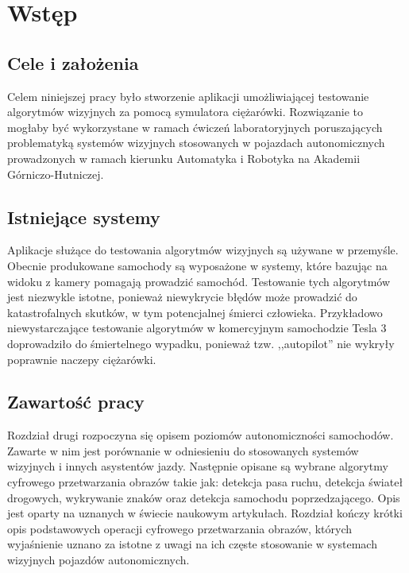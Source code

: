 \chapter{Wstęp}



\section{Cele i założenia}

Celem niniejszej pracy było stworzenie aplikacji umożliwiającej testowanie algorytmów wizyjnych za pomocą symulatora ciężarówki.
Rozwiązanie to mogłaby być wykorzystane w ramach ćwiczeń laboratoryjnych poruszających problematyką systemów wizyjnych stosowanych w pojazdach autonomicznych prowadzonych w ramach kierunku Automatyka i Robotyka na Akademii Górniczo-Hutniczej.

\section{Istniejące systemy}
Aplikacje służące do testowania algorytmów wizyjnych są używane w przemyśle. 
Obecnie produkowane samochody są wyposażone w systemy, które bazując na widoku z kamery pomagają prowadzić samochód. 
Testowanie tych algorytmów jest niezwykle istotne, ponieważ niewykrycie błędów może prowadzić do katastrofalnych skutków, w tym potencjalnej śmierci człowieka. 
Przykładowo niewystarczające testowanie algorytmów w komercyjnym samochodzie Tesla 3 doprowadziło do śmiertelnego wypadku, ponieważ tzw. ,,autopilot'' nie wykryły poprawnie naczepy ciężarówki.

\section{Zawartość pracy}

Rozdział drugi rozpoczyna się opisem poziomów autonomiczności samochodów. 
Zawarte w nim jest porównanie w odniesieniu do stosowanych systemów wizyjnych i innych asystentów jazdy. %
Następnie opisane są wybrane algorytmy cyfrowego przetwarzania obrazów takie jak: detekcja pasa ruchu, detekcja świateł drogowych, wykrywanie znaków oraz detekcja samochodu poprzedzającego. %
Opis jest oparty na uznanych w świecie naukowym artykułach. %
Rozdział kończy krótki opis podstawowych operacji cyfrowego przetwarzania obrazów, których wyjaśnienie uznano za istotne z uwagi na ich częste stosowanie w systemach wizyjnych pojazdów autonomicznych.

